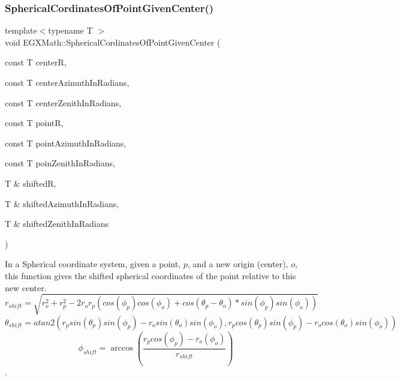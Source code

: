 \subsubsection{\texorpdfstring{Spherical\+Cordinates\+Of\+Point\+Given\+Center()}{SphericalCordinatesOfPointGivenCenter()}}
{\footnotesize\ttfamily template$<$typename T $>$ \\
void E\+G\+X\+Math\+::\+Spherical\+Cordinates\+Of\+Point\+Given\+Center (\begin{DoxyParamCaption}\item[{const T}]{centerR,  }\item[{const T}]{center\+Azimuth\+In\+Radians,  }\item[{const T}]{center\+Zenith\+In\+Radians,  }\item[{const T}]{pointR,  }\item[{const T}]{point\+Azimuth\+In\+Radians,  }\item[{const T}]{poin\+Zenith\+In\+Radians,  }\item[{T \&}]{shiftedR,  }\item[{T \&}]{shifted\+Azimuth\+In\+Radians,  }\item[{T \&}]{shifted\+Zenith\+In\+Radians }\end{DoxyParamCaption})}



In a Spherical coordinate system, given a point, $p$, and a new origin (center), $o$, this function gives the shifted spherical coordinates of the point relative to this new center. \[ r_{shift} = \sqrt{r_o^2+r_p^2 - 2 r_o r_p ( cos(\phi_p) cos(\phi_o) + cos(\theta_p-\theta_o) * sin(\phi_p) sin(\phi_o))}\] \[ \theta_{shift} = atan2( r_p sin(\theta_p) sin(\phi_p) - r_o sin(\theta_o) sin(\phi_o) , r_p cos(\theta_p) sin(\phi_p) - r_o cos(\theta_o) sin(\phi_o) )\] \[ \phi_{shift} = \arccos(\frac{r_p cos(\phi_p) - r_o (\phi_o)}{r_{shift}}) \]. 

